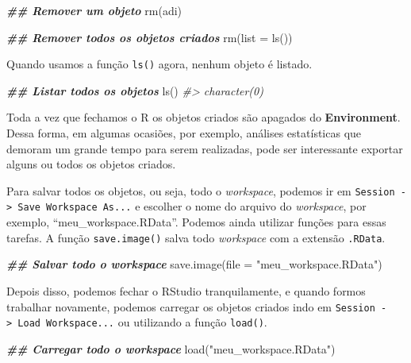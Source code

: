 \documentclass[
]{book}
\newenvironment{Shaded}{\begin{snugshade}}{\end{snugshade}}
\newcommand{\AttributeTok}[1]{\textcolor[rgb]{0.61,0.61,0.61}{#1}}
\newcommand{\CommentTok}[1]{\textcolor[rgb]{0.37,0.37,0.37}{\textit{#1}}}
\newcommand{\DocumentationTok}[1]{\textcolor[rgb]{0.37,0.37,0.37}{\textbf{\textit{#1}}}}
\newcommand{\FunctionTok}[1]{\textcolor[rgb]{0,0,0}{#1}}
\newcommand{\NormalTok}[1]{#1}
\newcommand{\StringTok}[1]{\textcolor[rgb]{0.5,0.5,0.5}{#1}}
\begin{document}
\begin{Shaded}
\begin{Highlighting}[]
\DocumentationTok{\#\# Remover um objeto}
\FunctionTok{rm}\NormalTok{(adi)}

\DocumentationTok{\#\# Remover todos os objetos criados}
\FunctionTok{rm}\NormalTok{(}\AttributeTok{list =} \FunctionTok{ls}\NormalTok{())}
\end{Highlighting}
\end{Shaded}

Quando usamos a função \texttt{ls()} agora, nenhum objeto é listado.

\begin{Shaded}
\begin{Highlighting}[]
\DocumentationTok{\#\# Listar todos os objetos}
\FunctionTok{ls}\NormalTok{()}
\CommentTok{\#\textgreater{} character(0)}
\end{Highlighting}
\end{Shaded}

Toda a vez que fechamos o R os objetos criados são apagados do \textbf{Environment}. Dessa forma, em algumas ocasiões, por exemplo, análises estatísticas que demoram um grande tempo para serem realizadas, pode ser interessante exportar alguns ou todos os objetos criados.

Para salvar todos os objetos, ou seja, todo o \emph{workspace}, podemos ir em \texttt{Session\ -\textgreater{}\ Save\ Workspace\ As...} e escolher o nome do arquivo do \emph{workspace}, por exemplo, ``meu\_workspace.RData''. Podemos ainda utilizar funções para essas tarefas. A função \texttt{save.image()} salva todo \emph{workspace} com a extensão \texttt{.RData}.

\begin{Shaded}
\begin{Highlighting}[]
\DocumentationTok{\#\# Salvar todo o workspace}
\FunctionTok{save.image}\NormalTok{(}\AttributeTok{file =} \StringTok{"meu\_workspace.RData"}\NormalTok{)}
\end{Highlighting}
\end{Shaded}

Depois disso, podemos fechar o RStudio tranquilamente, e quando formos trabalhar novamente, podemos carregar os objetos criados indo em \texttt{Session\ -\textgreater{}\ Load\ Workspace...} ou utilizando a função \texttt{load()}.

\begin{Shaded}
\begin{Highlighting}[]
\DocumentationTok{\#\# Carregar todo o workspace}
\FunctionTok{load}\NormalTok{(}\StringTok{"meu\_workspace.RData"}\NormalTok{)}
\end{Highlighting}
\end{Shaded}
\end{document}
